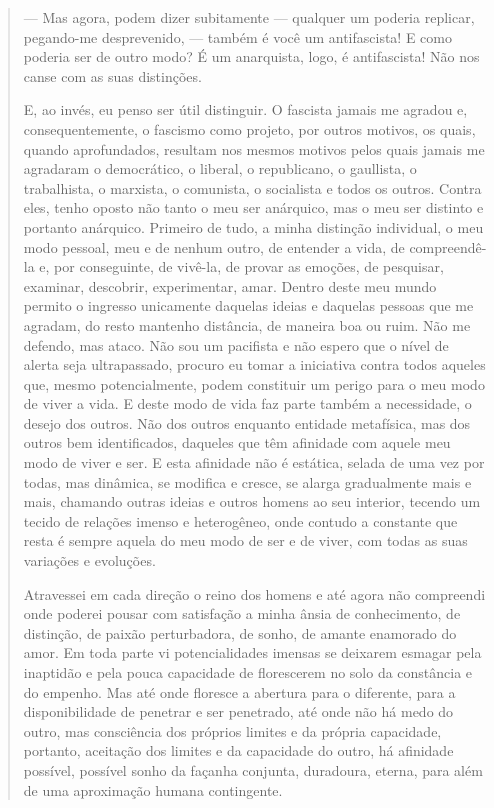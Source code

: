 \begin{quote}
--- Mas agora, podem dizer subitamente --- qualquer um poderia replicar,
pegando-me desprevenido, --- também é você um antifascista! E como
poderia ser de outro modo? É um anarquista, logo, é antifascista! Não
nos canse com as suas distinções.

E, ao invés, eu penso ser útil distinguir. O fascista jamais me agradou
e, consequentemente, o fascismo como projeto, por outros motivos, os
quais, quando aprofundados, resultam nos mesmos motivos pelos quais
jamais me agradaram o democrático, o liberal, o republicano, o
gaullista, o trabalhista, o marxista, o comunista, o socialista e todos
os outros. Contra eles, tenho oposto não tanto o meu ser anárquico, mas
o meu ser distinto e portanto anárquico. Primeiro de tudo, a minha
distinção individual, o meu modo pessoal, meu e de nenhum outro, de
entender a vida, de compreendê-la e, por conseguinte, de vivê-la, de
provar as emoções, de pesquisar, examinar, descobrir, experimentar,
amar. Dentro deste meu mundo permito o ingresso unicamente daquelas
ideias e daquelas pessoas que me agradam, do resto mantenho distância,
de maneira boa ou ruim. Não me defendo, mas ataco. Não sou um pacifista
e não espero que o nível de alerta seja ultrapassado, procuro eu tomar a
iniciativa contra todos aqueles que, mesmo potencialmente, podem
constituir um perigo para o meu modo de viver a vida. E deste modo de
vida faz parte também a necessidade, o desejo dos outros. Não dos outros
enquanto entidade metafísica, mas dos outros bem identificados, daqueles
que têm afinidade com aquele meu modo de viver e ser. E esta afinidade
não é estática, selada de uma vez por todas, mas dinâmica, se modifica e
cresce, se alarga gradualmente mais e mais, chamando outras ideias e
outros homens ao seu interior, tecendo um tecido de relações imenso e
heterogêneo, onde contudo a constante que resta é sempre aquela do meu
modo de ser e de viver, com todas as suas variações e evoluções.

Atravessei em cada direção o reino dos homens e até agora não compreendi
onde poderei pousar com satisfação a minha ânsia de conhecimento, de
distinção, de paixão perturbadora, de sonho, de amante enamorado do
amor. Em toda parte vi potencialidades imensas se deixarem esmagar pela
inaptidão e pela pouca capacidade de florescerem no solo da constância e
do empenho. Mas até onde floresce a abertura para o diferente, para a
disponibilidade de penetrar e ser penetrado, até onde não há medo do
outro, mas consciência dos próprios limites e da própria capacidade,
portanto, aceitação dos limites e da capacidade do outro, há afinidade
possível, possível sonho da façanha conjunta, duradoura, eterna, para
além de uma aproximação humana contingente.


\end{quote}
